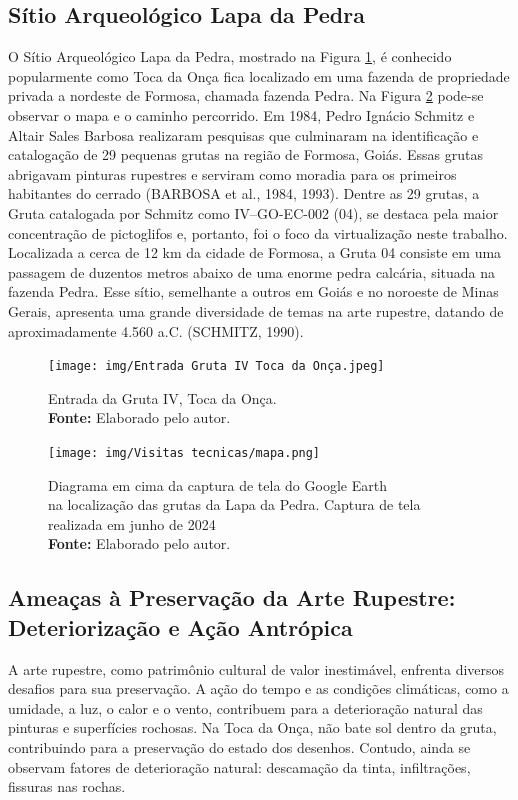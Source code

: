\subsection {Sítio Arqueológico Lapa da Pedra}\label{sec:sitio lapa da pedra}
O Sítio Arqueológico Lapa da Pedra, mostrado na Figura \ref{fig:Entrada da Gruta IV,Toca da Onça}, é conhecido popularmente como Toca da Onça fica localizado em uma fazenda de propriedade privada a nordeste de Formosa, chamada fazenda Pedra. Na Figura \ref{fig:mapa} pode-se observar o mapa e o caminho percorrido. Em 1984, Pedro Ignácio Schmitz e Altair Sales Barbosa realizaram pesquisas que culminaram na identificação e catalogação de 29 pequenas grutas na região de Formosa, Goiás. Essas grutas abrigavam pinturas rupestres e serviram como moradia para os primeiros habitantes do cerrado (BARBOSA et al., 1984, 1993). 
Dentre as 29 grutas, a Gruta catalogada por Schmitz como IV–GO-EC-002 (04), se destaca pela maior concentração de pictoglifos e, portanto, foi o foco da virtualização neste trabalho. Localizada a cerca de 12 km da cidade de Formosa, a Gruta 04 consiste em uma passagem de duzentos metros abaixo de uma enorme pedra calcária, situada na fazenda Pedra. Esse sítio, semelhante a outros em Goiás e no noroeste de Minas Gerais, apresenta uma grande diversidade de temas na arte rupestre, datando de aproximadamente 4.560 a.C. (SCHMITZ, 1990).


\begin{figure}[H]
    \centering
    \texttt{[image: img/Entrada Gruta IV Toca da Onça.jpeg]}
    \caption{Entrada da Gruta IV, Toca da Onça. \\
        \textbf{Fonte:} Elaborado pelo autor.}
    \label{fig:Entrada da Gruta IV,Toca da Onça}
\end{figure}

\begin{figure}[H]
    \centering
    \texttt{[image: img/Visitas tecnicas/mapa.png]}
    \caption{ Diagrama em cima da captura de tela do Google Earth \\ na localização das grutas da Lapa da Pedra. Captura de tela realizada em junho de 2024 \\
        \textbf{Fonte:} Elaborado pelo autor.}
    \label{fig:mapa}
\end{figure}


\subsection{Ameaças à Preservação da Arte Rupestre: Deteriorização e Ação Antrópica}\label{sec:amecas a preservação}
A arte rupestre, como patrimônio cultural de valor inestimável, enfrenta diversos desafios para sua preservação. A ação do tempo e as condições climáticas, como a umidade, a luz, o calor e o vento, contribuem para a deterioração natural das pinturas e superfícies rochosas.
Na Toca da Onça,  não bate sol dentro da gruta, contribuindo para a preservação do estado dos desenhos. Contudo, ainda se observam fatores de deterioração natural: descamação da tinta, infiltrações, fissuras nas rochas.



